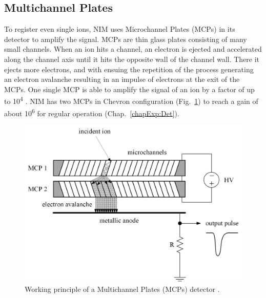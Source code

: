 	\subsection{Multichannel Plates}\label{sec:DetParam}
	To register even single ions, NIM uses Microchannel Plates (MCPs) in its detector to amplify the signal. MCPs are thin glass plates consisting of many small channels. When an ion hits a channel, an electron is ejected and accelerated along the channel axis until it hits the opposite wall of the channel wall. There it ejects more electrons, and with ensuing the repetition of the process generating an electron avalanche resulting in an impulse of electrons at the exit of the MCPs. One single MCP is able to amplify the signal of an ion by a factor of up to 10\textsuperscript{4} \cite{Wiza_1979_MCP}. NIM has two MCPs in Chevron configuration (Fig.~\ref{fig:MCPPrincipleSchema}) to reach a gain of about 10\textsuperscript{6} for regular operation (Chap.~\ref{chapExp:Det}).
	\begin{figure}[h]
		\centering
		\includegraphics[width=.7\textwidth]{Bilder/MCP_PrinipleSchema.jpg}
		\caption{Working principle of a Multichannel Plates (MCPs) detector \cite{Wiza_1979_MCP,Diss_Meyer}.}
		\label{fig:MCPPrincipleSchema}
	\end{figure}
	
